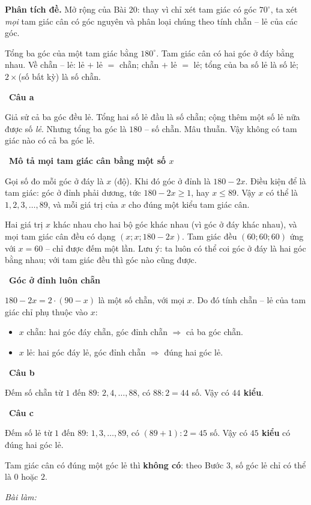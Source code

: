\documentclass[11pt]{article}
\newif\ifsol \solfalse
\newcommand{\probsol}[1]{%
  \begin{lrbox}{\solmeasure}\begin{minipage}{\dimexpr\linewidth-24pt\relax}#1\end{minipage}\end{lrbox}%
  \ifsol
    \begin{solbox}#1\end{solbox}%
  \else
    \setlength{\solht}{\dimexpr\ht\solmeasure+\dp\solmeasure+0.85cm\relax}%
    \ifdim\solht<1.35cm\setlength{\solht}{1.35cm}\fi
    \ifdim\solht>\StudentMaxWork\setlength{\solht}{\StudentMaxWork}\fi
    \begin{tcolorbox}[colback=white,colframe=Line,boxrule=0.8pt,arc=5pt,
      left=8pt,right=8pt,top=4pt,bottom=4pt,height=\solht]{\footnotesize\color{Slate}\itshape\WorkWord}\end{tcolorbox}%
  \fi}
\newlength{\StudentMaxWork}\setlength{\StudentMaxWork}{7.5cm}
\newcommand{\step}[2]{\par\smallskip\noindent{\bfseries\color{tmBlue!85!black}\StepWord~#1.}\ {\bfseries #2}\par\nopagebreak}
\def\WorkWord{Bài làm:}
\def\StepWord{Bước}
\begin{document}
\probsol{
\textbf{Phân tích đề.} Mở rộng của Bài 20: thay vì chỉ xét tam giác có góc $70^\circ$, ta xét \emph{mọi} tam giác cân có góc nguyên và phân loại chúng theo tính chẵn -- lẻ của các góc.
\begin{recallbox}Tổng ba góc của một tam giác bằng $180^\circ$. Tam giác cân có hai góc ở đáy bằng nhau. Về chẵn -- lẻ: lẻ $+$ lẻ $=$ chẵn; chẵn $+$ lẻ $=$ lẻ; tổng của ba số lẻ là số lẻ; $2\times$(số bất kỳ) là số chẵn.\end{recallbox}

\step{1}{Câu a}
Giả sử cả ba góc đều lẻ. Tổng hai số lẻ đầu là số chẵn; cộng thêm một số lẻ nữa được số \emph{lẻ}. Nhưng tổng ba góc là $180$ -- số chẵn. Mâu thuẫn. Vậy không có tam giác nào có cả ba góc lẻ.

\step{2}{Mô tả mọi tam giác cân bằng một số $x$}
Gọi số đo mỗi góc ở đáy là $x$ (độ). Khi đó góc ở đỉnh là $180-2x$. Điều kiện để là tam giác: góc ở đỉnh phải dương, tức $180-2x\ge 1$, hay $x\le 89$. Vậy $x$ có thể là $1,2,3,\dots,89$, và mỗi giá trị của $x$ cho đúng một kiểu tam giác cân.
\begin{proofbox}Hai giá trị $x$ khác nhau cho hai bộ góc khác nhau (vì góc ở đáy khác nhau), và mọi tam giác cân đều có dạng $(x;x;180-2x)$. Tam giác đều $(60;60;60)$ ứng với $x=60$ -- chỉ được đếm một lần. Lưu ý: ta luôn có thể coi góc ở đáy là hai góc bằng nhau; với tam giác đều thì góc nào cũng được.\end{proofbox}

\step{3}{Góc ở đỉnh luôn chẵn}
$180-2x=2\cdot(90-x)$ là một số chẵn, với mọi $x$. Do đó tính chẵn -- lẻ của tam giác chỉ phụ thuộc vào $x$:
\begin{itemize}[leftmargin=1.3em,itemsep=1pt]
\item $x$ chẵn: hai góc đáy chẵn, góc đỉnh chẵn $\Rightarrow$ cả ba góc chẵn.
\item $x$ lẻ: hai góc đáy lẻ, góc đỉnh chẵn $\Rightarrow$ đúng hai góc lẻ.
\end{itemize}

\step{4}{Câu b}
Đếm số chẵn từ $1$ đến $89$: $2,4,\dots,88$, có $88:2=44$ số. Vậy có \textbf{$44$ kiểu}.

\step{5}{Câu c}
Đếm số lẻ từ $1$ đến $89$: $1,3,\dots,89$, có $(89+1):2=45$ số. Vậy có \textbf{$45$ kiểu} có đúng hai góc lẻ.\par
Tam giác cân có đúng một góc lẻ thì \textbf{không có}: theo Bước 3, số góc lẻ chỉ có thể là $0$ hoặc $2$.

}
\end{document}
